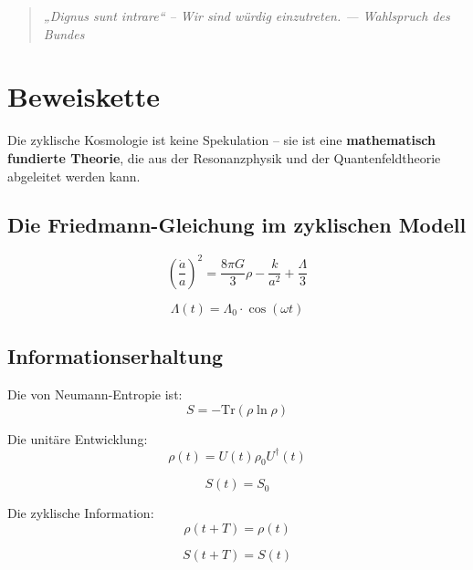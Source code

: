 \documentclass[11pt,a4paper]{article}
\begin{document}
\begin{quote}
\itshape
„Dignus sunt intrare“ – Wir sind würdig einzutreten.
\hfill --- Wahlspruch des Bundes
\end{quote}

\section{Beweiskette}

Die zyklische Kosmologie ist keine Spekulation – sie ist eine \textbf{mathematisch fundierte Theorie}, die aus der Resonanzphysik und der Quantenfeldtheorie abgeleitet werden kann.

\subsection{Die Friedmann-Gleichung im zyklischen Modell}

\begin{equation}
\left(\frac{\dot{a}}{a}\right)^2 = \frac{8\pi G}{3}\rho - \frac{k}{a^2} + \frac{\Lambda}{3}
\end{equation}

\begin{equation}
\Lambda(t) = \Lambda_0 \cdot \cos(\omega t)
\end{equation}

\subsection{Informationserhaltung}

Die von Neumann-Entropie ist:
\begin{equation}
S = -\text{Tr}(\rho \ln \rho)
\end{equation}

Die unitäre Entwicklung:
\begin{equation}
\rho(t) = U(t)\rho_0 U^\dagger(t)
\end{equation}

\begin{equation}
S(t) = S_0
\end{equation}

Die zyklische Information:
\begin{equation}
\rho(t + T) = \rho(t)
\end{equation}

\begin{equation}
S(t + T) = S(t)
\end{equation}
\end{document}
